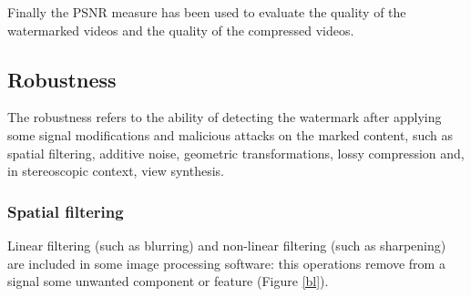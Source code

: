 Finally the PSNR measure has been used to evaluate the quality of the watermarked videos and the quality of the compressed videos.

\subsection{Robustness}
The robustness refers to the ability of detecting the watermark after applying some signal modifications
and malicious attacks on the marked content, such as spatial filtering, additive noise, geometric  transformations, lossy compression and, in stereoscopic context, view synthesis.

\subsubsection{Spatial filtering}
Linear filtering (such as blurring) and non-linear filtering (such as sharpening) are included in some image processing software: this operations remove from a signal some unwanted component or feature (Figure \ref{bl}).

